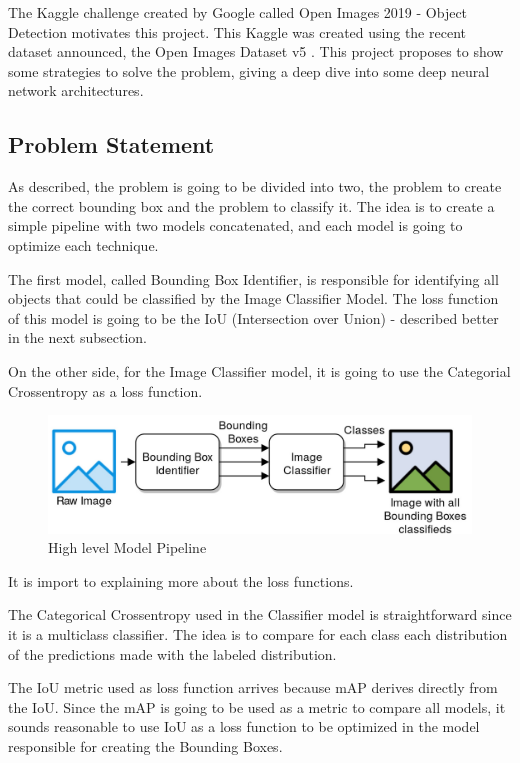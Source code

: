 \documentclass[11pt, a4paper, onecolumn]{article}
\begin{document}
The Kaggle challenge created by Google called Open Images 2019 - Object Detection \cite{kaggle} motivates this project. This Kaggle was created using the recent dataset announced, the Open Images Dataset v5 \cite{google:1}. This project proposes to show some strategies to solve the problem, giving a deep dive into some deep neural network architectures. 

\subsection{Problem Statement}

As described, the problem is going to be divided into two, the problem to create the correct bounding box and the problem to classify it. The idea is to create a simple pipeline with two models concatenated, and each model is going to optimize each technique.

The first model, called Bounding Box Identifier, is responsible for identifying all objects that could be classified by the Image Classifier Model. The loss function of this model is going to be the IoU (Intersection over Union) - described better in the next subsection.

On the other side, for the Image Classifier model, it is going to use the Categorial Crossentropy as a loss function.

\begin{figure}[ht]
	\centering
	\includegraphics[width=1\textwidth]{high-level-architecture.jpg}
	\caption{\scriptsize High level Model Pipeline}
\end{figure}

It is import to explaining more about the loss functions. 

The Categorical Crossentropy used in the Classifier model is straightforward since it is a multiclass classifier. The idea is to compare for each class each distribution of the predictions made with the labeled distribution.

The IoU metric used as loss function arrives because mAP derives directly from the IoU. Since the mAP is going to be used as a metric to compare all models, it sounds reasonable to use IoU as a loss function to be optimized in the model responsible for creating the Bounding Boxes.
\end{document}
